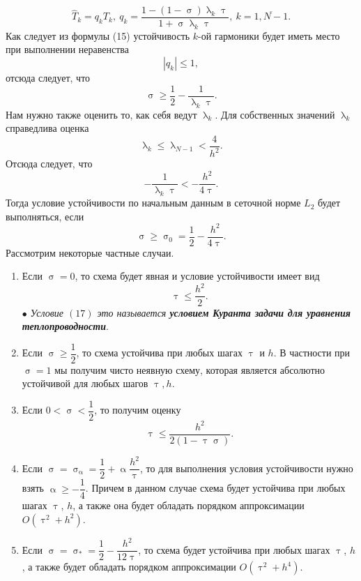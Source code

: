 \documentclass[a4paper, 12pt]{report}
\numberwithin{equation}{section}
\newcommand{\ol}{\overline}
\renewcommand{\leq}{\leqslant}
\renewcommand{\geq}{\geqslant}
\renewcommand{\alpha}{\upalpha}
\renewcommand{\tau}{\uptau}
\renewcommand{\lambda}{\uplambda}
\renewcommand{\sigma}{\upsigma}
\begin{document}
	\begin{equation}
		\hat T_k = q_k T_k,\ q_k = \dfrac{1 - (1-\sigma)\lambda_k \tau}{1+\sigma \lambda_k \tau},\ k = \ol {1, N-1}.
	\end{equation}
	Как следует из формулы (15) устойчивость $k$-ой гармоники будет иметь место при выполнении неравенства
	$$|q_k|\leq 1,$$
	отсюда следует, что 
	$$\sigma \geq \dfrac 12 - \dfrac{1}{\lambda_k \tau}.$$
	Нам нужно также оценить то, как себя ведут $\lambda_k$. Для собственных значений $\lambda_k$ справедлива оценка
	$$\lambda_k \leq \lambda _{N-1} < \dfrac{4}{h^2}.$$
	Отсюда следует, что 
	$$-\dfrac{1}{\lambda_k\tau} < -\dfrac{h^2}{4\tau}.$$
	Тогда условие устойчивости по начальным данным в сеточной норме $L_2$ будет выполняться, если 
	\begin{equation}
		\sigma \geq \sigma_0 = \dfrac 12 - \dfrac {h^2}{4\tau}.
	\end{equation}
	Рассмотрим некоторые частные случаи.
	\begin{enumerate}
		\item Если $\sigma = 0$, то схема будет явная и условие устойчивости имеет вид
		\begin{equation}
			\tau \leq \dfrac{h^2}{2}.
		\end{equation}
		$\bullet$ \textit{Условие $(17)$ это называется \textbf{условием Куранта задачи для уравнения теплопроводности}}.
		\item Если $\sigma \geq \dfrac 12$, то схема устойчива при любых шагах $\tau$ и $h$. В частности при $\sigma = 1$ мы получим чисто неявную схему, которая является абсолютно устойчивой для любых шагов $\tau, h$.
		\item Если $ 0 < \sigma < \dfrac 12$, то получим оценку
		\begin{equation}
			\tau \leq \dfrac{h^2}{2(1-\tau\sigma)}.
		\end{equation}
		\item Если $\sigma = \sigma_\alpha = \dfrac 12 + \alpha \dfrac {h^2}{\tau}$, то для выполнения условия устойчивости нужно взять $\alpha \geq -\dfrac 1 4$. Причем в данном случае схема будет устойчива при любых шагах $\tau$, $h$, а также она будет обладать порядком аппроксимации $O(\tau^2 + h^2)$.
		\item Если $\sigma = \sigma_* = \dfrac 12 - \dfrac{h^2}{12\tau}$, то схема будет устойчива при любых шагах $\tau$, $h$, а также будет обладать порядком аппроксимации $O(\tau^2 + h^4)$.
	\end{enumerate}
\end{document}
